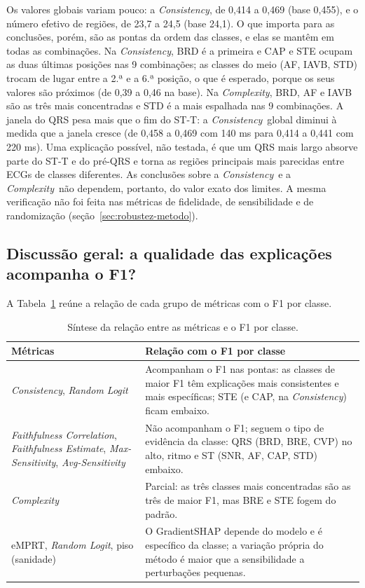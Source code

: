 \documentclass[11pt,a4paper]{article}
\newcommand{\fonte}[1]{\par\vspace{2pt}{\centering\footnotesize Fonte: #1\par}}
\newcommand{\FC}{\textit{Faithfulness Correlation}}
\newcommand{\FE}{\textit{Faithfulness Estimate}}
\newcommand{\MS}{\textit{Max-Sensitivity}}
\newcommand{\AS}{\textit{Avg-Sensitivity}}
\newcommand{\CX}{\textit{Complexity}}
\newcommand{\CS}{\textit{Consistency}}
\newcommand{\RL}{\textit{Random Logit}}
\newcommand{\EM}{eMPRT}
\begin{document}
Os valores globais variam pouco: a \CS, de 0,414 a 0,469 (base 0,455), e o número efetivo de regiões, de 23,7 a 24,5 (base 24,1). O que importa para as conclusões, porém, são as pontas da ordem das classes, e elas se mantêm em todas as combinações. Na \CS, BRD é a primeira e CAP e STE ocupam as duas últimas posições nas 9 combinações; as classes do meio (AF, IAVB, STD) trocam de lugar entre a 2.ª e a 6.ª posição, o que é esperado, porque os seus valores são próximos (de 0,39 a 0,46 na base). Na \CX, BRD, AF e IAVB são as três mais concentradas e STD é a mais espalhada nas 9 combinações. A janela do QRS pesa mais que o fim do ST-T: a \CS\ global diminui à medida que a janela cresce (de 0,458 a 0,469 com 140 ms para 0,414 a 0,441 com 220 ms). Uma explicação possível, não testada, é que um QRS mais largo absorve parte do ST-T e do pré-QRS e torna as regiões principais mais parecidas entre ECGs de classes diferentes. As conclusões sobre a \CS\ e a \CX\ não dependem, portanto, do valor exato dos limites. A mesma verificação não foi feita nas métricas de fidelidade, de sensibilidade e de randomização (seção~\ref{sec:robustez-metodo}).

\subsection{Discussão geral: a qualidade das explicações acompanha o F1?}\label{sec:sintese}
A Tabela~\ref{tab:sintese} reúne a relação de cada grupo de métricas com o F1 por classe.

\begin{table}[H]\centering\small
\caption{Síntese da relação entre as métricas e o F1 por classe.}\label{tab:sintese}
\begin{tabularx}{\linewidth}{>{\raggedright\arraybackslash}p{4.2cm}X}
\toprule
\textbf{Métricas} & \textbf{Relação com o F1 por classe} \\
\midrule
\CS, \RL & Acompanham o F1 nas pontas: as classes de maior F1 têm explicações mais consistentes e mais específicas; STE (e CAP, na \CS) ficam embaixo. \\ \addlinespace
\FC, \FE, \MS, \AS & Não acompanham o F1; seguem o tipo de evidência da classe: QRS (BRD, BRE, CVP) no alto, ritmo e ST (SNR, AF, CAP, STD) embaixo. \\ \addlinespace
\CX & Parcial: as três classes mais concentradas são as três de maior F1, mas BRE e STE fogem do padrão. \\ \addlinespace
\EM, \RL, piso (sanidade) & O GradientSHAP depende do modelo e é específico da classe; a variação própria do método é maior que a sensibilidade a perturbações pequenas. \\
\bottomrule
\end{tabularx}
\fonte{Elaborado pelo autor.}
\end{table}
\end{document}
